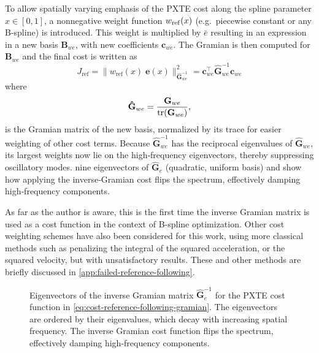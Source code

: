 To allow spatially varying emphasis of the PXTE cost along the spline parameter $x\in[0,1]$, a nonnegative weight function $w_{\rm ref}(x)$ (e.g.\ piecewise constant or any B-spline) is introduced. This weight is multiplied by $\bar e$ resulting in an expression in a new basis $\mathbf B_{we}$, with new coefficients $\mathbf c_{we}$. The Gramian is then computed for $\mathbf B_{we}$ and the final cost is written as
\begin{equation}\label{eq:cost-reference-following-gramian}
    J_\text{ref} = \|w_\text{ref}(x)\;\mathbf e(x)\|_{\mathbf{\hat G}_{we}^{-1}}^2 
    = \mathbf{c}_{we}^\top \mathbf{\hat G}_{we}^{-1} \mathbf{c}_{we}
\end{equation}
where
\begin{equation}\label{eq:gramian-density}
    \mathbf{\hat G}_{we} = \frac{\mathbf G_{we}}{\operatorname{tr}(\mathbf G_{we})}, 
\end{equation}
is the Gramian matrix of the new basis, normalized by its trace for easier weighting of other cost terms. 
Because $\mathbf{\hat G}_{we}^{-1}$ has the reciprocal eigenvalues of $\mathbf{\hat G}_{we}$, its largest weights now lie on the high‐frequency eigenvectors, thereby suppressing oscillatory modes.  nine eigenvectors of $\mathbf{\hat G}_e$ (quadratic, uniform basis) and show how applying the inverse‐Gramian cost flips the spectrum, effectively damping high‐frequency components.


As far as the author is aware, this is the first time the inverse Gramian matrix is used as a cost function in the context of B-spline optimization.
Other cost weighting schemes have also been considered for this work, using more classical methods such as penalizing the integral of the squared acceleration, or the squared velocity, but with unsatisfactory results. These and other methods are briefly discussed in \cref{app:failed-reference-following}.

\begin{figure}
    \centering
    
    \caption{Eigenvectors of the inverse Gramian matrix $\mathbf{\hat G}_e^{-1}$ for the PXTE cost function in \cref{eq:cost-reference-following-gramian}. The eigenvectors are ordered by their eigenvalues, which decay with increasing spatial frequency. The inverse Gramian cost function flips the spectrum, effectively damping high‐frequency components.}    
    \label{fig:inverse-gramian-eigenvectors}
\end{figure}


